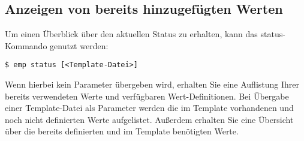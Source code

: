 \subsection{Anzeigen von bereits hinzugefügten Werten}
Um einen Überblick über den aktuellen Status zu erhalten, kann das status-Kommando genutzt werden:
\begin{lstlisting}[style=Bash]
$ emp status [<Template-Datei>]
\end{lstlisting}
Wenn hierbei kein Parameter übergeben wird, erhalten Sie eine Auflistung Ihrer bereits verwendeten Werte und verfügbaren Wert-Definitionen.
Bei Übergabe einer Template-Datei als Parameter werden die im Template vorhandenen und noch nicht definierten Werte aufgelistet. Außerdem erhalten Sie eine Übersicht über die bereits definierten und im Template benötigten Werte.
